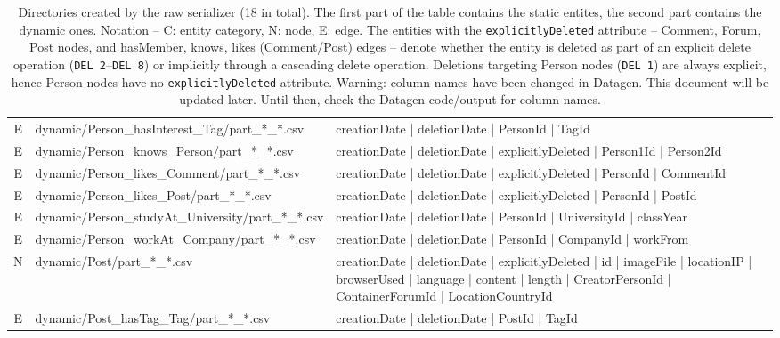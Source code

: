 \begin{table}[htb]
\begin{tabularx}{\textwidth}{|c|l|X|}
            E                    & dynamic/Person\_hasInterest\_Tag/part\_*\_*.csv      & creationDate | deletionDate | PersonId | TagId \\
            E                    & dynamic/Person\_knows\_Person/part\_*\_*.csv         & creationDate | deletionDate | explicitlyDeleted | Person1Id | Person2Id \\
            E                    & dynamic/Person\_likes\_Comment/part\_*\_*.csv        & creationDate | deletionDate | explicitlyDeleted | PersonId | CommentId \\
            E                    & dynamic/Person\_likes\_Post/part\_*\_*.csv           & creationDate | deletionDate | explicitlyDeleted | PersonId | PostId \\
            E                    & dynamic/Person\_studyAt\_University/part\_*\_*.csv   & creationDate | deletionDate | PersonId | UniversityId | classYear \\
            E                    & dynamic/Person\_workAt\_Company/part\_*\_*.csv       & creationDate | deletionDate | PersonId | CompanyId | workFrom \\
            \hline
            N                    & dynamic/Post/part\_*\_*.csv                          & creationDate | deletionDate | explicitlyDeleted | id | imageFile | locationIP | browserUsed | language | content | length | CreatorPersonId | ContainerForumId | LocationCountryId \\
            E                    & dynamic/Post\_hasTag\_Tag/part\_*\_*.csv             & creationDate | deletionDate | PostId | TagId \\
            \hline
        \end{tabularx}
    \caption{Directories created by the raw serializer (18 in total). The first part of the table contains the static entites, the second part contains the dynamic ones. Notation -- C: entity category, N: node, E: edge.
        The entities with the \texttt{explicitlyDeleted} attribute -- Comment, Forum, Post nodes, and hasMember, knows, likes (Comment/Post) edges -- denote whether the entity is deleted as part of an explicit delete operation (\texttt{DEL 2}--\texttt{DEL 8}) or implicitly through a cascading delete operation. Deletions targeting Person nodes (\texttt{DEL 1}) are always explicit, hence Person nodes have no \texttt{explicitlyDeleted} attribute.
        Warning: column names have been changed in Datagen. This document will be updated later. Until then, check the Datagen code/output for column names.
        }
    \label{table:csv-raw}
\end{table}
